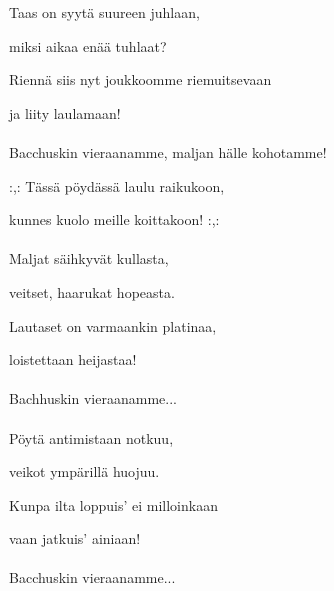 
Taas on syytä suureen juhlaan, 

miksi aikaa enää tuhlaat? 

Riennä siis nyt joukkoomme riemuitsevaan 

ja liity laulamaan! 
\\ \hspace{10mm} \\

Bacchuskin vieraanamme, maljan hälle kohotamme! 

:,: Tässä pöydässä laulu raikukoon, 

kunnes kuolo meille koittakoon! :,: 
\\ \hspace{10mm} \\

Maljat säihkyvät kullasta, 

veitset, haarukat hopeasta. 

Lautaset on varmaankin platinaa, 

loistettaan heijastaa!  
\\ \hspace{10mm} \\

Bachhuskin vieraanamme...  
\\ \hspace{10mm} \\

Pöytä antimistaan notkuu, 

veikot ympärillä huojuu. 

Kunpa ilta loppuis' ei milloinkaan 

vaan jatkuis' ainiaan!  
\\ \hspace{10mm} \\

Bacchuskin vieraanamme...